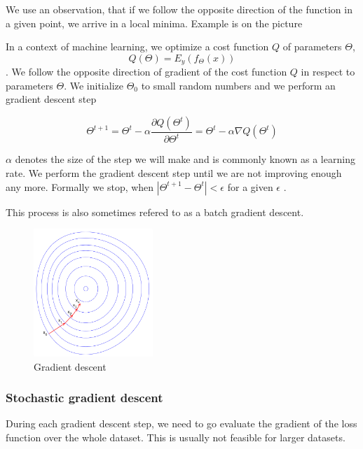         We use an observation, that if we follow the opposite direction of the function in a given point, 
        we arrive in a local minima. Example is on the picture \* %
        
        In a context of machine learning, we optimize a cost function $Q$ of parameters $\Theta$, 
        $$Q(\Theta) = E_y(f_\Theta(x))$$. We follow the opposite direction of gradient of the cost function $Q$ in respect to parameters $\Theta$. We initialize $\Theta_0$ to small random numbers and we perform an gradient descent step
        
        $$\Theta^{t+1} = \Theta^t - \alpha \frac{\partial Q(\Theta^t)}{\partial \Theta^t} = \Theta^t - \alpha \nabla Q(\Theta^t)$$
        
        $\alpha$ denotes the size of the step we will make and is commonly known as a learning rate. 
        We perform the gradient descent step until we are not improving enough any more. 
        Formally we stop, when $|\Theta^{t+1} - \Theta^t| < \epsilon$ for a given $\epsilon$ \cite{bottou-bousquet-2008}.
        
        This process is also sometimes refered to as a batch gradient descent.

        \begin{figure}
        \centerline{\includegraphics[width=0.4\textwidth]{images/gradient_descent}}
        \caption[Gradient descent]{Gradient descent \cite{pict} \*}
        \label{obr:gradient}
        \end{figure}
        
        
        \subsubsection{Stochastic gradient descent}
        
        During each gradient descent step, we need to go evaluate the gradient of the loss function over the whole dataset. 
        This is usually not feasible for larger datasets. 
        
